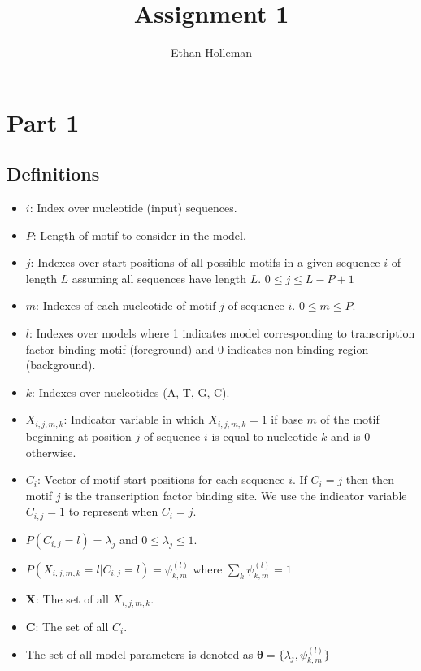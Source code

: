 \documentclass[12pt]{article}
\theoremstyle{definition}
\begin{document}
\title{
	Assignment 1}

\author{Ethan Holleman}
\maketitle

\section{Part 1}

\subsection{Definitions}

\begin{itemize}
	\item $i$: Index over nucleotide (input) sequences.
	\item $P$: Length of motif to consider in the model.
	\item $j$: Indexes over start positions of all possible motifs in a given sequence $i$ of length $L$ assuming all sequences have length $L$. $0 \leq j \leq L - P+1$
	\item $m$: Indexes of each nucleotide of motif $j$ of sequence $i$. $0 \leq m \leq P$.
	\item $l$: Indexes over models where 1 indicates model corresponding to transcription factor binding motif (foreground) and 0 indicates non-binding region (background).
	\item $k$: Indexes over nucleotides (A, T, G, C).
	\item $X_{i,j,m,k}$: Indicator variable in which $X_{i,j,m,k}=1$ if base $m$ of the motif beginning at position $j$ of sequence $i$ is equal to nucleotide $k$ and is 0 otherwise.
	\item $C_{i}$: Vector of motif start positions for each sequence $i$. If $C_{i} = j$ then then motif $j$ is the transcription factor binding site.
	\subitem We use the indicator variable $C_{i,j}=1$ to represent when $C_{i} = j$.
	\item $P(C_{i,j} = l) = \lambda_{j}$ and $0 \leq \lambda_{j} \leq 1$.
	\item $P(X_{i,j,m,k}=l | C_{i,j}=l) = \psi_{k, m}^{(l)}$ where $\sum_{k}\psi^{(l)}_{k ,m}=1$
	\item $\boldsymbol{X}$: The set of all $X_{i,j,m,k}$.
	\item $\boldsymbol{C}$: The set of all $C_{i}$.
	\item The set of all model parameters is denoted as $\boldsymbol{\theta} = \{\lambda_{j}, \psi^{(l)}_{k ,m}\}$
\end{itemize}
\end{document}
